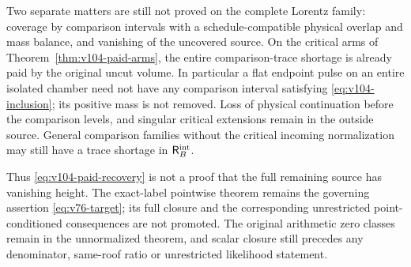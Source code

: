 Two separate matters are still not proved on the complete Lorentz
family: coverage by comparison intervals with a schedule-compatible
physical overlap and mass balance, and vanishing of the uncovered source. On the
critical arms of Theorem~\ref{thm:v104-paid-arms}, the entire
comparison-trace shortage is already paid by the original uncut volume. In particular a flat endpoint
pulse on an entire isolated chamber need not have any comparison
interval satisfying \eqref{eq:v104-inclusion}; its positive mass is
not removed. Loss of physical continuation before the comparison
levels, and singular critical extensions remain in the
outside source. General comparison families without the critical
incoming normalization may still have a trace shortage in
$\mathsf R_B^{\rm int}$.

Thus \eqref{eq:v104-paid-recovery} is not a proof that the full
remaining source has vanishing height. The exact-label pointwise
theorem remains the governing assertion \eqref{eq:v76-target}; its
full closure and the corresponding unrestricted point-conditioned
consequences are not promoted. The original arithmetic zero classes
remain in the unnormalized theorem, and scalar closure still precedes
any denominator, same-roof ratio or unrestricted likelihood statement.
